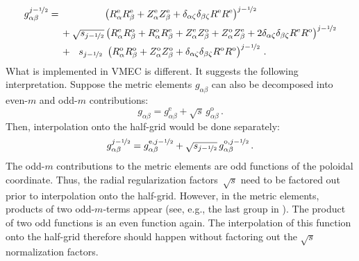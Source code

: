\begin{align}
  g_{\alpha \beta}^{j-\half} =&\, \phantom{+ \sqrt{s_{j-\half}}}~ \left(   R_\alpha^\mathrm{e} R_\beta^\mathrm{e} + Z_\alpha^\mathrm{e} Z_\beta^\mathrm{e}
                                                                         + \delta_{\alpha \zeta} \delta_{\beta \zeta} R^\mathrm{e} R^\mathrm{e} \right)^{j-\half} \nonumber \\
                             ~&\,          + \sqrt{s_{j-\half}}   \left(   R_\alpha^\mathrm{e} R_\beta^\mathrm{o} + R_\alpha^\mathrm{o} R_\beta^\mathrm{e}
                                                                         + Z_\alpha^\mathrm{e} Z_\beta^\mathrm{o} + Z_\alpha^\mathrm{o} Z_\beta^\mathrm{e}
                                                                         + 2 \delta_{\alpha \zeta} \delta_{\beta \zeta} R^\mathrm{e} R^\mathrm{o} \right)^{j-\half} \nonumber \\
                             ~&\,          + ~~s_{j-\half}~       \left(   R_\alpha^\mathrm{o} R_\beta^\mathrm{o} + Z_\alpha^\mathrm{o} Z_\beta^\mathrm{o}
                                                                         + \delta_{\alpha \zeta} \delta_{\beta \zeta} R^\mathrm{o} R^\mathrm{o} \right)^{j-\half} \, . \label{eqn:metric_elements_10}
\end{align}
What is implemented in VMEC is different.
It suggests the following interpretation.
Suppose the metric elements $g_{\alpha \beta}$ can also be decomposed into even-$m$ and odd-$m$ contributions:
\begin{equation}
  g_{\alpha \beta} = g_{\alpha \beta}^\mathrm{e} + \sqrt{s} \, g_{\alpha \beta}^\mathrm{o} \, .
\end{equation}
Then, interpolation onto the half-grid would be done separately:
\begin{equation}
  g_{\alpha \beta}^{j-\nicefrac{1}{2}} = g_{\alpha \beta}^{\mathrm{e}, j-\nicefrac{1}{2}} + \sqrt{s_{j-\nicefrac{1}{2}}} \, g_{\alpha \beta}^{\mathrm{o}, j-\nicefrac{1}{2}} \, .
\end{equation}
The odd-$m$ contributions to the metric elements are odd functions of the poloidal coordinate.
Thus, the radial regularization factors~$ \sqrt{s}$ need to be factored out prior to interpolation onto the half-grid.
However, in the metric elements, products of two odd-$m$-terms appear (see, e.g., the last group in ).
The product of two odd functions is an even function again.
The interpolation of this function onto the half-grid therefore should happen without factoring out the $\sqrt{s}$ normalization factors.
